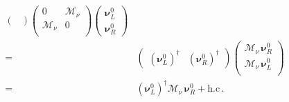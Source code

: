 \begin{frame}
\begin{align}
\begin{pmatrix}
  \end{pmatrix}
  \begin{pmatrix}
                                      0 & \boldsymbol{\mathcal{M}}_{\nu} \\
                                      \boldsymbol{\mathcal{M}}_{\nu} & 0 \\
                                    \end{pmatrix}
\begin{pmatrix}
    \boldsymbol{\nu}_L^{0} \\
    \boldsymbol{\nu}_R^{0}
  \end{pmatrix} \nonumber\\
=&  \begin{pmatrix}
    \left( \boldsymbol{\nu}_L^0 \right)^{\dagger}&
    \left(\boldsymbol{\nu}_R^0  \right)^{\dagger}
  \end{pmatrix}
  \begin{pmatrix}
         \boldsymbol{\mathcal{M}}_{\nu}\,\boldsymbol{\nu}_R^{0} \\
    \boldsymbol{\mathcal{M}}_{\nu}\, \boldsymbol{\nu}_L^{0} \\
  \end{pmatrix} \nonumber\\
  =&\left( \boldsymbol{\nu}_L^0 \right)^{\dagger} \boldsymbol{\mathcal{M}}_{\nu}\,   \boldsymbol{\nu}_R^{0} +\text{h.c}\,.
\end{align}
\end{frame}
